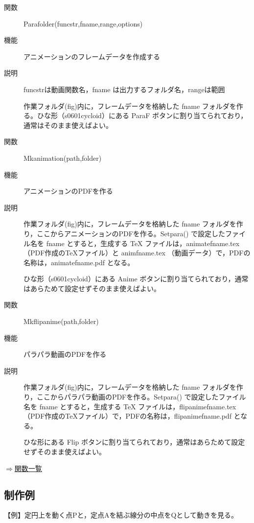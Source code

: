\documentclass[papersize,a4paper,12pt,uplatex]{jsarticle}
\begin{document}
\begin{description}
\vspace{\baselineskip}
\item[関数] Parafolder(funcstr,fname,range,options)
\item[機能]アニメーションのフレームデータを作成する
\item[説明]funcstrは動画関数名，fname は出力するフォルダ名，rangeは範囲

作業フォルダ(fig)内に，フレームデータを格納した fname フォルダを作る。ひな形（s0601cycloid）にある ParaF ボタンに割り当てられており，通常はそのまま使えばよい。

\vspace{\baselineskip}
\item[関数]Mkanimation(path,folder)
\item[機能]アニメーションのPDFを作る
\item[説明]作業フォルダ(fig)内に，フレームデータを格納した fname フォルダを作り，ここからアニメーションのPDFを作る。Setpara() で設定したファイル名を fname とすると，生成する TeX ファイルは，animatefname.tex （PDF作成のTeXファイル）と animfname.tex （動画データ）で，PDFの名称は，animatefname.pdf となる。

ひな形（s0601cycloid）にある Anime ボタンに割り当てられており，通常はあらためて設定せずそのまま使えばよい。

\vspace{\baselineskip}
\item[関数]Mkflipanime(path,folder)
\item[機能]パラパラ動画のPDFを作る
\item[説明]作業フォルダ(fig)内に，フレームデータを格納した fname フォルダを作り，ここからパラパラ動画のPDFを作る。Setpara() で設定したファイル名を fname とすると，生成する TeX ファイルは，flipanimefname.tex （PDF作成のTeXファイル）で，PDFの名称は，flipanimefname.pdf となる。

ひな形にある Flip ボタンに割り当てられており，通常はあらためて設定せずそのまま使えばよい。

\end{description}

\begin{flushright}\hyperlink{functionlist}{$\Rightarrow$関数一覧}\end{flushright}

\subsection{制作例}

\vspace{\baselineskip}
【例】定円上を動く点Pと，定点Aを結ぶ線分の中点をQとして動きを見る。
\end{document}
